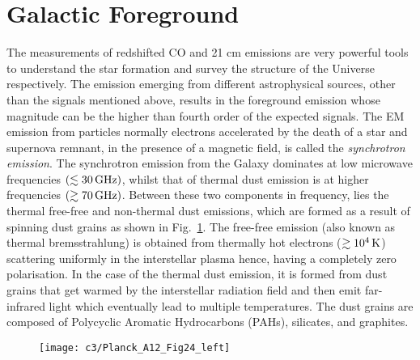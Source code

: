 \section{Galactic Foreground}	   \label{chap3:sec1}
The measurements of redshifted CO and 21 cm emissions are very powerful tools to understand the star formation and survey the structure of the Universe respectively. 
The emission emerging from different astrophysical sources, other than the signals mentioned above, results in the foreground emission whose magnitude can be the higher than
fourth order of the expected signals. The EM emission from particles normally electrons accelerated by the death of a star and supernova remnant, in the presence of a magnetic field, 
is called the \emph{synchrotron emission}. The synchrotron emission from the Galaxy dominates at low microwave frequencies $(\lesssim 30 \, \rm GHz)$, 
whilst that of thermal dust emission is at higher frequencies $(\gtrsim 70 \, \rm GHz)$. Between these two components in frequency, lies the thermal free-free and non-thermal 
dust emissions, which are formed as a result of spinning dust grains \citep{2016A&A...594A..10P} as shown in Fig.~\ref{fig:cmb1}. 
The free-free emission (also known as thermal bremsstrahlung) is obtained from thermally hot electrons ($\gtrsim 10^4\, \rm K$) \citep{1999astro.ph..2201S} scattering uniformly in
the interstellar plasma hence, having a completely zero polarisation. In the case of the thermal dust emission,
it is formed from dust grains that get warmed by the interstellar radiation field and then emit far-infrared light which eventually lead to multiple temperatures.
The dust grains are composed of Polycyclic Aromatic Hydrocarbons (PAHs), silicates, and graphites. 


%
\begin{figure}[ht]
	    \centering	    
	    \texttt{[image: c3/Planck\_A12\_Fig24\_left]} %
	    \caption{} \label{fig:cmb1}
       \end{figure}
  \FloatBarrier  

